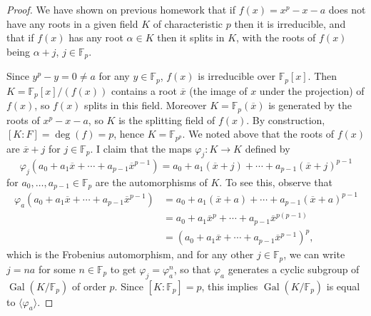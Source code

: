 \documentclass[10pt]{article}
\providecommand{\ol}{\overline}
\providecommand{\Gal}{\operatorname{Gal}}
\providecommand{\FF}{\mathbb F}
\begin{document}
\begin{proof}
    We have shown on previous homework that if $f(x) = x^p - x - a$
    does not have any roots in a given field $K$ of characteristic $p$
    then it is irreducible, and that if $f(x)$ has any root
    $\alpha\in K$ then it splits in $K$,
    with the roots of $f(x)$ being $\alpha + j$, $j\in\FF_p$.

    Since $y^p - y = 0\ne a$ for any $y\in\FF_p$,
    $f(x)$ is irreducible over $\FF_p[x]$.
    Then $K = \FF_p[x]/(f(x))$ contains a root $\ol x$
    (the image of $x$ under the projection)
    of $f(x)$, so $f(x)$ splits in this field.
    Moreover $K = \FF_p(\ol x)$ is generated by
    the roots of $x^p - x - a$, so $K$ is the splitting field of $f(x)$.
    By construction, $[K : F] = \deg(f) = p$, hence $K = \FF_{p^p}$.
    We noted above that the roots of $f(x)$ are
    $\ol x + j$ for $j\in\FF_p$.
    I claim that the maps $\varphi_j\colon K\to K$ defined by
    \begin{equation*}
	\varphi_j(a_0 + a_1\ol x + \cdots + a_{p-1}\ol x^{p-1})
	= a_0 + a_1(\ol x + j) + \cdots + a_{p-1}(\ol x + j)^{p-1}
    \end{equation*}
    for $a_0,\dots,a_{p-1}\in\FF_p$ are the automorphisms of $K$.
    To see this, observe that
    \begin{align*}
	\varphi_a(a_0 + a_1\ol x + \cdots + a_{p-1}\ol x^{p-1})
	&= a_0 + a_1(\ol x + a) + \cdots + a_{p-1}(\ol x + a)^{p-1}\\
	&= a_0 + a_1\ol x^p + \cdots + a_{p-1}\ol x^{p(p-1)}\\
	&= (a_0 + a_1\ol x + \cdots + a_{p-1}\ol x^{p-1})^p,
    \end{align*}
    which is the Frobenius automorphism,
    and for any other $j\in\FF_p$,
    we can write $j = na$ for some $n\in\FF_p$
    to get $\varphi_j = \varphi_a^n$, so that
    $\varphi_a$ generates a cyclic subgroup of $\Gal(K/\FF_p)$
    of order $p$. Since $[K : \FF_p] = p$, this implies
    $\Gal(K/\FF_p)$ is equal to $\langle \varphi_a\rangle$.
\end{proof}
\end{document}
